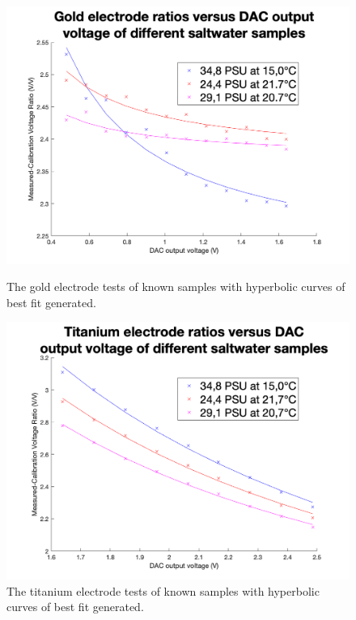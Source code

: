 \begin{figure}[ht]
    \begin{minipage}{0.5\textwidth}
        \centering
        \includegraphics[width=\textwidth]{Figures/Testing/Au_sweep_analysis}
        \caption{The gold electrode tests of known samples with hyperbolic curves of best fit generated.}
        \label{fig:test15} %
    \end{minipage}
    \begin{minipage}{0.5\textwidth}
        \centering
        \includegraphics[width=\textwidth]{Figures/Testing/Ti_sweep_analysis}
        \caption{The titanium electrode tests of known samples with hyperbolic curves of best fit generated.}
        \label{fig:test16} %
    \end{minipage}
\end{figure}

